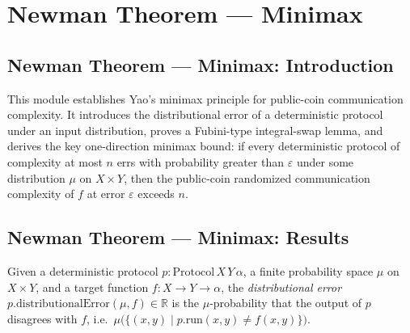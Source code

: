 \section{Newman Theorem --- Minimax}
\subsection*{Newman Theorem --- Minimax: Introduction}

This module establishes Yao's minimax principle for public-coin communication complexity.
It introduces the distributional error of a deterministic protocol under an input
distribution, proves a Fubini-type integral-swap lemma, and derives the key one-direction
minimax bound: if every deterministic protocol of complexity at most $n$ errs with
probability greater than $\varepsilon$ under some distribution $\mu$ on $X \times Y$,
then the public-coin randomized communication complexity of $f$ at error $\varepsilon$
exceeds $n$.

\subsection*{Newman Theorem --- Minimax: Results}

\begin{definition}
\label{CommunicationComplexity.Deterministic.Protocol.distributionalError}
\leanok
{}
Given a deterministic protocol $p : \mathrm{Protocol}\,X\,Y\,\alpha$, a finite
probability space $\mu$ on $X \times Y$, and a target function $f : X \to Y \to \alpha$,
the \emph{distributional error} $p.\mathrm{distributionalError}(\mu, f) \in \mathbb{R}$
is the $\mu$-probability that the output of $p$ disagrees with $f$, i.e.\
$\mu\bigl(\{(x,y) \mid p.\mathrm{run}(x,y) \ne f(x,y)\}\bigr)$.
\end{definition}


